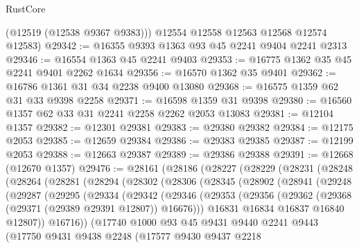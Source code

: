 \begin{lexlean}{RustCore}
\begin{coremodule}
        (@12519 (@12538 @9367 @9383)))
      @12554
      @12558
      @12563
      @12568
      @12574
      @12583)
@29342 := @16355 @9393 @1363 @93 @45 @2241 @9404 @2241 @2313
@29346 := @16554 @1363 @45 @2241 @9403
@29353 := @16775 @1362 @35 @45 @2241 @9401 @2262 @1634
@29356 := @16570 @1362 @35 @9401
@29362 := @16786 @1361 @31 @34 @2238 @9400 @13080
@29368 := @16575 @1359 @62 @31 @33 @9398 @2258
@29371 := @16598 @1359 @31 @9398
@29380 := @16560 @1357 @62 @33 @31 @2241 @2258 @2262 @2053 @13083
@29381 := @12104 @1357
@29382 := @12301 @29381
@29383 := @29380 @29382
@29384 := @12175 @2053
@29385 := @12659 @29384
@29386 := @29383 @29385
@29387 := @12199 @2053
@29388 := @12663 @29387
@29389 := @29386 @29388
@29391 := @12668 (@12670 @1357)
@29476 := @28161
    (@28186
      (@28227
        (@28229
          (@28231
            (@28248
              (@28264
                (@28281
                  (@28294
                    (@28302
                      (@28306
                        (@28345
                          (@28902
                            (@28941
                              (@29248
                                (@29287
                                  (@29295
                                    (@29334
                                      (@29342
                                        (@29346
                                          (@29353
                                            (@29356
                                              (@29362
                                                (@29368 (@29371 (@29389 @29391 @12807)) @16676)))
                                            @16831
                                            @16834
                                            @16837
                                            @16840
                                            @12807))
                                        @16716))
                                    (@17740
                                      @1000
                                      @93
                                      @45
                                      @9431
                                      @9440
                                      @2241
                                      @9443
                                      (@17750
                                        @9431
                                        @9438
                                        @2248
                                        (@17577
                                          @9430
                                          @9437
                                          @2218

\end{coremodule}
\end{lexlean}
